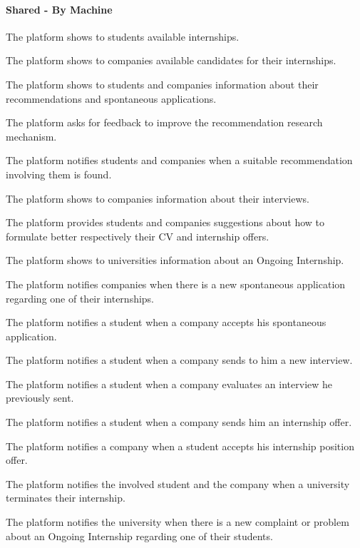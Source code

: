 \paragraph{Shared - By Machine}
\begin{enumerate}[label={\color{titleColor}[SPM\arabic*]}]
    \item The platform shows to students available internships.
\item The platform shows to companies available candidates for their internships.
\item The platform shows to students and companies information about their recommendations and spontaneous applications.
\item The platform asks for feedback to improve the recommendation research mechanism.
\item The platform notifies students and companies when a suitable recommendation involving them is found.
\item The platform shows to companies information about their interviews.
\item The platform provides students and companies suggestions about how to formulate better respectively their CV and internship offers.
\item The platform shows to universities information about an Ongoing Internship.
\item The platform notifies companies when there is a new spontaneous application regarding one of their internships.
\item The platform notifies a student when a company accepts his spontaneous application.
\item The platform notifies a student when a company sends to him a new interview.
\item The platform notifies a student when a company evaluates an interview he previously sent.
\item The platform notifies a student when a company sends him an internship offer.
\item The platform notifies a company when a student accepts his internship position offer.
\item The platform notifies the involved student and the company when a university terminates their internship.
\item The platform notifies the university when there is a new complaint or problem about an Ongoing Internship regarding one of their students.

\end{enumerate}
